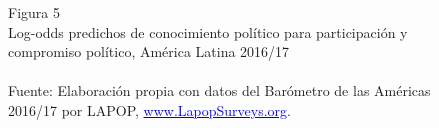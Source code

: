 \documentclass[a4paper]{tufte-handout}
\begin{document}
\begin{figure}[h!]
\captionsetup[subfigure]{labelformat=empty}
  \centering
  \smallskip\noindent\small Figura 5 \\ Log-odds predichos de conocimiento político para participación y compromiso político, América Latina 2016/17
  \\
  \\ \smallskip\noindent\scriptsize Fuente: Elaboración propia con datos del Barómetro de las Américas 2016/17 por LAPOP, \href{https://www.vanderbilt.edu/lapop/}{\textcolor{blue}{www.LapopSurveys.org}}.
\end{figure}
\end{document}
